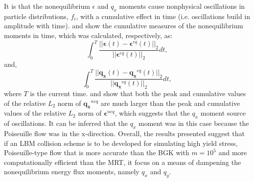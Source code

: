 It is \DIFdelbegin {}\DIFdelend \DIFaddbegin {}\DIFaddend that the nonequilibrium $\epsilon$ and $q_x$ moments cause nonphysical oscillations in particle distributions, $f_i$, with a cumulative effect in time (i.e. oscillations build in amplitude with time).
 and  show the cumulative measures of the nonequilibrium moments in time, which was calculated, respectively, as:
\begin{equation}
  \int_0^{T} \frac{||\boldsymbol{\epsilon}(t) - \boldsymbol{\epsilon}^{eq}(t)||_2}{||\boldsymbol{\epsilon}^{eq}(t)||_2} dt,
\end{equation}
\noindent and,
\begin{equation}
  \int_0^{T} \frac{||\mathbf{q_x}(t) - \mathbf{q_x}^{eq}(t)||_2}{||\mathbf{q_x}^{eq}(t)||_2} dt,
\end{equation}
\noindent where $T$ is the current time. 
 and  show that both the peak and cumulative values of the relative $L_2$ norm of $\mathbf{q_x}^{neq}$ are much larger than the peak and cumulative values of the relative $L_2$ norm of $\boldsymbol{\epsilon}^{neq}$, which suggests that the \DIFdelbegin {}\DIFdelend \DIFaddbegin {}\DIFaddend $q_x$ moment \DIFdelbegin {}\DIFdelend \DIFaddbegin {}\DIFaddend source of oscillations.
It can be inferred that the \DIFaddbegin {}\DIFaddend $q_x$ moment was \DIFdelbegin {}\DIFdelend \DIFaddbegin {}\DIFaddend in this case because the Poiseuille flow was in the x-direction.
Overall, the results presented suggest that if an LBM collision scheme is to be developed for simulating high yield stress, Poiseuille-type flow that is more accurate than the BGK with $m = 10^5$ and more computationally efficient than the MRT, it \DIFdelbegin {}\DIFdelend \DIFaddbegin {}\DIFaddend focus on a means of dampening the nonequilibrium energy flux moments, namely $q_x$ and $q_y$.

